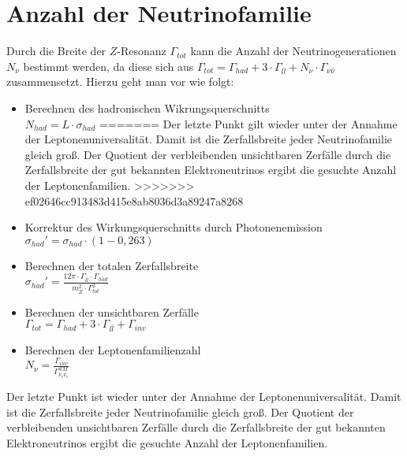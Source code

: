 \documentclass{include/thesisclass3}
\newcommand{\cc}{\cdot}
\begin{document}
\section{Anzahl der Neutrinofamilie}
Durch die Breite der $Z$-Resonanz $\Gamma_{tot}$ kann die Anzahl der Neutrinogenerationen $N_\nu$ bestimmt werden, da diese sich aus $\Gamma_{tot} = \Gamma_{had} + 3 \cc \Gamma_{l \bar l} + N_\nu \cc \Gamma_{\nu \bar \nu}$ zusammensetzt. Hierzu geht man vor wie folgt:\\
\begin{itemize}
\item Berechnen des hadronischen Wikrungsquerschnitts\\
$N_{had}=L\cdot \sigma_{had}$
=======
Der letzte Punkt gilt wieder unter der Annahme der Leptonenuniversalität. Damit ist die Zerfallsbreite jeder Neutrinofamilie gleich groß. Der Quotient der verbleibenden unsichtbaren Zerfälle durch die Zerfallsbreite der gut bekannten Elektroneutrinos ergibt die gesuchte Anzahl der Leptonenfamilien.
>>>>>>> ef02646cc913483d415e8ab8036d3a89247a8268

\item Korrektur des Wirkungsquerschnitts durch Photonenemission\\
$\sigma_{had}'=\sigma_{had}\cdot(1-0,263) $

\item Berechnen der totalen Zerfallsbreite\\
$\sigma_{had}'=\frac{12 \pi \cdot \Gamma_{l\bar{l}}\cdot \Gamma_{had}}{m_Z^2\cdot \Gamma_{tot}^2}$
\item Berechnen  der unsichtbaren Zerfälle\\
$\Gamma_{tot} = \Gamma_{had} + 3 \cc \Gamma_{l \bar l} + \Gamma_{inv}$

\item  Berechnen der Leptonenfamilienzahl\\
$N_\nu=\frac{\Gamma_{inv}}{\Gamma_{\nu_e\bar{\nu_e}}^{SM}}$
\end{itemize}
Der letzte Punkt ist wieder unter der Annahme der Leptonenuniversalität. Damit ist die Zerfallsbreite jeder Neutrinofamilie gleich groß. Der Quotient der verbleibenden unsichtbaren Zerfälle durch die Zerfallsbreite der gut bekannten Elektroneutrinos ergibt die gesuchte Anzahl der Leptonenfamilien.
\end{document}
